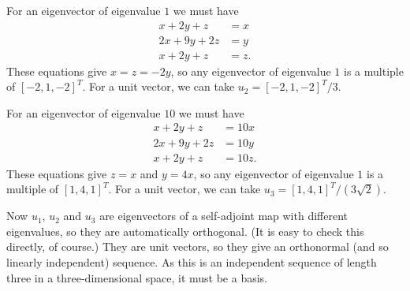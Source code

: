 \documentclass{amsart}
\renewcommand{\:}       {\colon}
\theoremstyle{definition}
\renewenvironment{solution}{\SolutionAtEnd}{\endSolutionAtEnd}
\begin{document}
\begin{solution}
\begin{itemize}
   For an eigenvector of eigenvalue $1$ we must have 
   \begin{align*}
    x+2y+z &= x \\
    2x+9y+2z &= y \\
    x+2y+z &= z.
   \end{align*}
   These equations give $x=z=-2y$, so any eigenvector of eigenvalue
   $1$ is a multiple of $[-2,1,-2]^T$.  For a unit vector, we can take
   $u_2=[-2,1,-2]^T/3$.    

   For an eigenvector of eigenvalue $10$ we must have 
   \begin{align*}
    x+2y+z &= 10x \\
    2x+9y+2z &= 10y \\
    x+2y+z &= 10z.
   \end{align*}
   These equations give $z=x$ and $y=4x$, so any eigenvector of eigenvalue
   $1$ is a multiple of $[1,4,1]^T$.  For a unit vector, we can take
   $u_3=[1,4,1]^T/(3\sqrt{2})$.

   Now $u_1$, $u_2$ and $u_3$ are eigenvectors of a self-adjoint
   map with different eigenvalues, so they are automatically
   orthogonal.  (It is easy to check this directly, of course.)  They
   are unit vectors, so they give an orthonormal (and so linearly
   independent) sequence.  As this is an independent sequence of
   length three in a three-dimensional space, it must be a basis.
 \end{itemize}
\end{solution}
\end{document}

